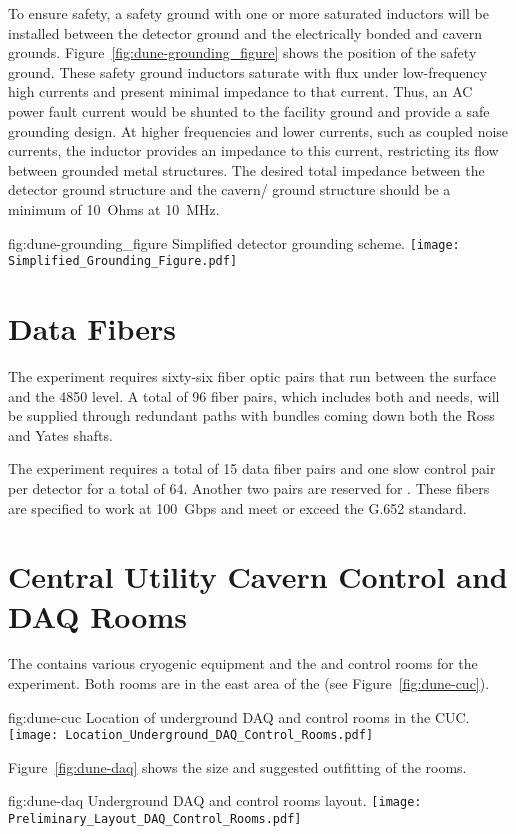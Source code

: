 To ensure safety, a safety ground with one or more saturated inductors
will be installed between the detector ground and the electrically
bonded  and cavern grounds.
Figure~\ref{fig:dune-grounding_figure} shows the position of the
safety ground. These safety ground inductors saturate with flux under
low-frequency high currents and present minimal impedance to that
current.  Thus, an AC power fault current would be shunted to the
facility ground and provide a safe grounding design. At higher
frequencies and lower currents, such as coupled noise currents, the
inductor provides an impedance to this current, restricting its flow
between grounded metal structures. The desired total impedance between
the detector ground structure and the cavern/ ground
structure should be a minimum of \SI{10}{Ohms} at \SI{10}{MHz}.
\begin{dunefigure}{fig:dune-grounding_figure}
  {Simplified detector grounding scheme.}
  \texttt{[image: Simplified\_Grounding\_Figure.pdf]}
\end{dunefigure}


\section{Data Fibers}
\label{sec:fdsp-coord-faci-fibers}


The  experiment requires sixty-six fiber
optic pairs that run between the surface and the 4850 level.  A
total of 96 fiber pairs, which includes both  and 
needs, will be supplied through redundant paths with bundles
coming down both the Ross and Yates shafts.


The experiment requires a total of 15 data fiber pairs and one slow
control pair per detector for a total of 64.  Another two pairs are
reserved for . These fibers are specified to work at
100~Gbps and meet or exceed the G.652 standard.


\section{Central Utility Cavern Control and DAQ Rooms}
\label{sec:fdsp-coord-cuc-daq}


The  contains various cryogenic equipment and the  and control
rooms for the  experiment.  Both rooms are in the east
area of the  (see Figure~\ref{fig:dune-cuc}).  
\begin{dunefigure}{fig:dune-cuc}
  {Location of underground DAQ and control rooms in the CUC.}
  \texttt{[image: Location\_Underground\_DAQ\_Control\_Rooms.pdf]}
\end{dunefigure}
Figure~\ref{fig:dune-daq} shows the size and suggested outfitting of the rooms.
\begin{dunefigure}{fig:dune-daq}
  {Underground DAQ and control rooms layout.}
  \texttt{[image: Preliminary\_Layout\_DAQ\_Control\_Rooms.pdf]}
\end{dunefigure}


